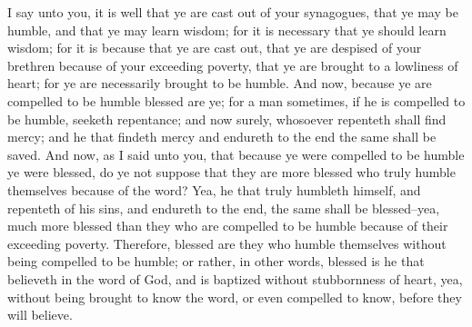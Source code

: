 \bverse \iffalse I say unto you, it is well that ye are cast out of your synagogues, that ye may be humble, and that ye may learn wisdom; for it is necessary that ye should learn wisdom; for it is because that ye are cast out, that ye are despised of your brethren because of your exceeding poverty, that ye are brought to a lowliness of heart; for ye are necessarily brought to be humble. \fi
I say unto you, it is well that ye are cast out of your synagogues, that ye may be humble, and that ye may learn wisdom; for it is necessary that ye should learn wisdom; for it is because that ye are cast out, that ye are despised of your brethren because of your exceeding poverty, that ye are brought to a lowliness of heart; for ye are necessarily brought to be humble.
\bverse \iffalse And now, because ye are compelled to be humble blessed are ye; for a man sometimes, if he is compelled to be humble, seeketh repentance; and now surely, whosoever repenteth shall find mercy; and he that findeth mercy and endureth to the end the same shall be saved. \fi
And now, because ye are compelled to be humble blessed are ye; for a man sometimes, if he is compelled to be humble, seeketh repentance; and now surely, whosoever repenteth shall find mercy; and he that findeth mercy and endureth to the end the same shall be saved.
\bverse \iffalse And now, as I said unto you, that because ye were compelled to be humble ye were blessed, do ye not suppose that they are more blessed who truly humble themselves because of the word? \fi
And now, as I said unto you, that because ye were compelled to be humble ye were blessed, do ye not suppose that they are more blessed who truly humble themselves because of the word?
\bverse \iffalse Yea, he that truly humbleth himself, and repenteth of his sins, and endureth to the end, the same shall be blessed--yea, much more blessed than they who are compelled to be humble because of their exceeding poverty. \fi
Yea, he that truly humbleth himself, and repenteth of his sins, and endureth to the end, the same shall be blessed--yea, much more blessed than they who are compelled to be humble because of their exceeding poverty.
\bverse \iffalse Therefore, blessed are they who humble themselves without being compelled to be humble; or rather, in other words, blessed is he that believeth in the word of God, and is baptized without stubbornness of heart, yea, without being brought to know the word, or even compelled to know, before they will believe. \fi
Therefore, blessed are they who humble themselves without being compelled to be humble; or rather, in other words, blessed is he that believeth in the word of God, and is baptized without stubbornness of heart, yea, without being brought to know the word, or even compelled to know, before they will believe.
